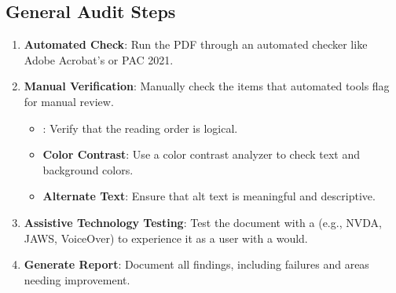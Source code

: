 \subsection{General Audit Steps}
\label{subsec:general-audit-steps}
\begin{enumerate}
	\item \textbf{Automated Check}: Run the PDF through an automated checker like Adobe Acrobat's or PAC 2021.
	\item \textbf{Manual Verification}: Manually check the items that automated tools flag for manual review.
	      \begin{itemize}
		      \item \textbf{}: Verify that the reading order is logical.
		      \item \textbf{Color Contrast}: Use a color contrast analyzer to check text and background colors.
		      \item \textbf{Alternate Text}: Ensure that alt text is meaningful and descriptive.
	      \end{itemize}
	\item \textbf{Assistive Technology Testing}: Test the document with a  (e.g., NVDA, JAWS, VoiceOver) to experience it as a user with a  would.
	\item \textbf{Generate Report}: Document all findings, including failures and areas needing improvement.
\end{enumerate}

